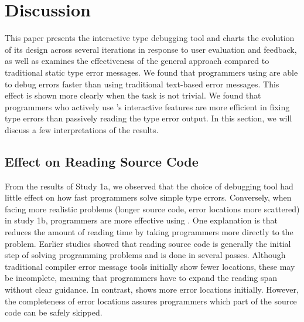 \section{Discussion}


This paper presents the interactive type debugging tool \chameleon{} and charts the evolution of its design across several iterations in response to user evaluation and feedback, as well as examines   the effectiveness of the general approach compared to traditional static type error messages. We found that programmers using \chameleon{} are able to debug errors faster than using traditional text-based error messages. This effect is shown more clearly when the task is not trivial. We found that programmers who actively use \chameleon{}'s interactive features are more efficient in fixing type errors than passively reading the type error output. In this section, we will discuss a few interpretations of the results.


\subsection{Effect on Reading Source Code}
From the results of Study 1a, we observed that the choice of debugging tool had little effect on how fast programmers solve simple type errors. Conversely, when facing more realistic problems (longer source code, error locations more scattered) in study 1b, programmers are more effective using \chameleon{}. One explanation is that \chameleon{} reduces the amount of reading time by taking programmers more directly to the problem. Earlier studies \cite{jbara_how_2015, peitek_what_2020} showed that reading source code is generally the initial step of solving programming problems and is done in several passes. Although traditional compiler error message tools initially show fewer locations, these may be incomplete, meaning that programmers have to expand the reading span without clear guidance. In contrast, \chameleon{} shows more error locations initially. However, the completeness of error locations assures programmers which part of the source code can be safely skipped.

